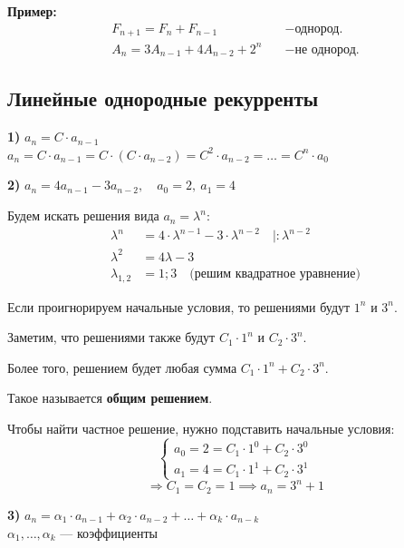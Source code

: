 \documentclass[10pt, a4paper]{article}
\begin{document}
\noindent \textbf{Пример:}
\begin{align*}
    F_{n+1} = F_n + F_{n-1} & \quad - \text{однород.} \\
    A_n = 3A_{n-1} + 4A_{n-2} + 2^n & \quad - \text{не однород.}
\end{align*}

\noindent \subsection*{Линейные однородные рекурренты}

\noindent \textbf{1)} $a_n = C \cdot a_{n-1}$\\
$a_n = C \cdot a_{n-1} = C \cdot (C \cdot a_{n-2}) = C^2 \cdot a_{n-2} = \dots = C^n \cdot a_0$

\medskip
\noindent \textbf{2)} $a_n = 4a_{n-1} - 3a_{n-2}, \quad a_0 = 2, \ a_1 = 4$

\vspace{0.5em}
\noindent Будем искать решения вида $a_n = \lambda^n$:
\begin{align*}
    \lambda^n &= 4 \cdot \lambda^{n-1} - 3 \cdot \lambda^{n-2} \quad \Big| : \lambda^{n-2} \\
    \lambda^2 &= 4\lambda - 3 \\
    \lambda_{1,2} &= 1; 3 \quad \text{(решим квадратное уравнение)}
\end{align*}

\noindent Если проигнорируем начальные условия, то решениями будут $1^n$ и $3^n$.

\vspace{0.5em}
\noindent Заметим, что решениями также будут $C_1 \cdot 1^n$ и $C_2 \cdot 3^n$.

\noindent Более того, решением будет любая сумма $C_1 \cdot 1^n + C_2 \cdot 3^n$.

\noindent Такое называется \textbf{общим решением}.

\bigskip
\noindent Чтобы найти частное решение, нужно подставить начальные условия:
$$
\begin{cases}
    a_0 = 2 = C_1 \cdot 1^0 + C_2 \cdot 3^0 \\
    a_1 = 4 = C_1 \cdot 1^1 + C_2 \cdot 3^1
\end{cases}
$$
$$ \Rightarrow C_1 = C_2 = 1 \implies a_n = 3^n + 1 $$

\bigskip
\noindent \textbf{3)} $a_n = \alpha_1 \cdot a_{n-1} + \alpha_2 \cdot a_{n-2} + \dots + \alpha_k \cdot a_{n-k}$ \\
$\alpha_1, \dots, \alpha_k$ — коэффициенты
\end{document}
